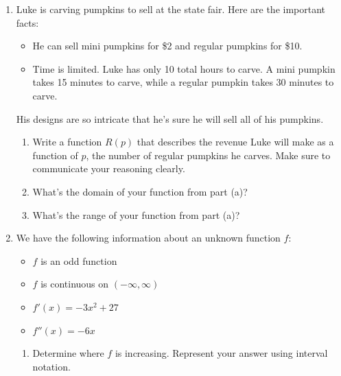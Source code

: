 \documentclass{article}
\begin{document}
\begin{enumerate}
\begin{enumerate}
\begin{problem}[\vfill]
    \end{problem}

\end{enumerate}
\newpage
 \item Luke is carving pumpkins to sell at the state fair. Here are the important facts:
 \begin{itemize}
     \item He can sell  mini pumpkins for \$2 and regular pumpkins for \$10.
     \item Time is limited. Luke has only 10 total hours to carve.  A mini pumpkin takes 15 minutes to carve, while a regular pumpkin takes 30 minutes to carve.
 \end{itemize}  
 His designs are so intricate that he's sure he will sell all of his pumpkins.
    \begin{enumerate}
        \item 
        \begin{problem} Write a function $R(p)$ that describes the revenue Luke will make as a function of $p$, the number of regular pumpkins he carves. Make sure to communicate your reasoning clearly. 
        \end{problem}
        \vspace{4in}
        \item 
        \begin{problem}[\vfill] What's the domain of your function from part (a)?
        \end{problem}
        \item 
        \begin{problem}[\vfill]
            What's the range of your function from part (a)?
        \end{problem}
    \end{enumerate}
\newpage
\item 

We have the following information about an unknown function $f$:
\begin{itemize}
    \item $f$ is an odd function
    \item $f$ is continuous on $(-\infty, \infty)$
    \item $f'(x)=-3x^2+27$
    \item $f''(x) = -6x$
\end{itemize}
\begin{enumerate}
    \item Determine where $f$ is increasing. Represent your answer using interval notation.
    \pspace{\vfill}
    

\end{enumerate}
\end{enumerate}
\end{document}
